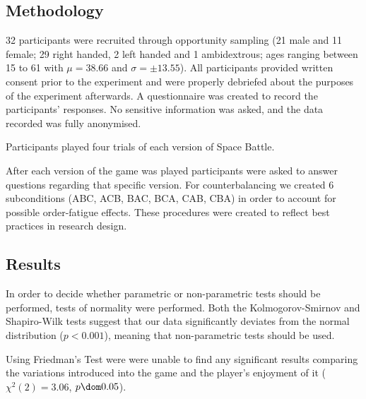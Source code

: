 \subsection{Methodology}

32 participants were recruited through opportunity sampling (21 male and 11 female; 29 right handed, 2 left handed and 1 ambidextrous; ages ranging between 15 to 61 with $\mu= 38.66$ and  $\sigma = \pm 13.55$). All participants provided written consent prior to the experiment and were properly debriefed about the purposes of the experiment afterwards. A questionnaire was created to record the participants' responses. No sensitive information was asked, and the data recorded was fully anonymised. 

Participants played four trials of each version of Space Battle.

After each version of the game was played participants were asked to answer questions regarding that specific version. For counterbalancing we created 6 subconditions (ABC, ACB, BAC, BCA, CAB, CBA) in order to account for possible order-fatigue effects. These procedures were created to reflect best practices in research design.


\subsection{Results}

In order to decide whether parametric or non-parametric tests should be performed, tests of normality were performed. Both the Kolmogorov-Smirnov and Shapiro-Wilk tests suggest that our data significantly deviates from the normal distribution ($p < 0.001$), meaning that non-parametric tests should be used.

Using Friedman's Test were were unable to find any significant results comparing the variations introduced into the game and the player's enjoyment of it ($\chi^2(2) = 3.06$, $p \dom 0.05$).